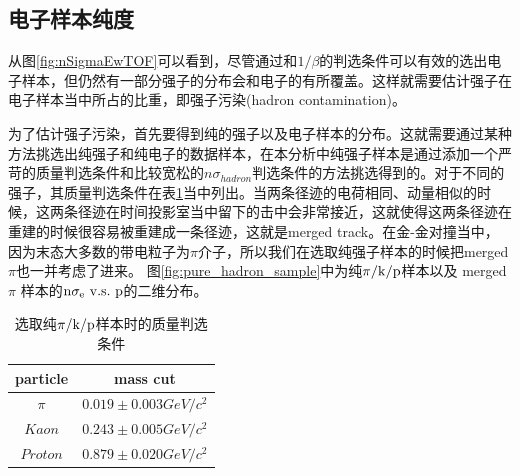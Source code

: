 \subsection{电子样本纯度}
\label{chap:pruity}

从图\ref{fig:nSigmaEwTOF}可以看到，尽管通过\nSigmaE 和$1/\beta$的判选条件可以有效的选出电子样本，但仍然有一部分强子的\nSigmaE 分布会和电子的有所覆盖。这样就需要估计强子在电子样本当中所占的比重，即强子污染(hadron contamination)。

为了估计强子污染，首先要得到纯的强子以及电子样本的\nSigmaE 分布。这就需要通过某种方法挑选出纯强子和纯电子的数据样本，在本分析中纯强子样本是通过添加一个严苛的质量判选条件和比较宽松的$n\sigma_{hadron}$判选条件的方法挑选得到的。对于不同的强子，其质量判选条件在表\ref{tab:pure_sample}当中列出。当两条径迹的电荷相同、动量相似的时候，这两条径迹在时间投影室当中留下的击中会非常接近，这就使得这两条径迹在重建的时候很容易被重建成一条径迹，这就是merged track。在金-金对撞当中，因为末态大多数的带电粒子为$\pi$介子，所以我们在选取纯强子样本的时候把merged $\pi$也一并考虑了进来。
图\ref{fig:pure_hadron_sample}中为纯$\rm{\pi/k/p}$样本以及 merged $\pi$ 样本的$\rm{n\sigma_{e}~v.s.~p}$的二维分布。

\begin{table}[]
    \centering
    \caption{选取纯$\rm{\pi/k/p}$样本时的质量判选条件}
    \begin{tabular}{|c|c|}
        \hline
        particle & mass cut  \\
        \hline
        $\pi$ & $ 0.019 \pm 0.003 GeV/c^2$\\
        \hline
        $Kaon$ & $ 0.243 \pm 0.005 GeV/c^2$\\
        \hline
        $Proton$ & $ 0.879 \pm 0.020 GeV/c^2$ \\
        \hline
    \end{tabular}
    \label{tab:pure_sample}
\end{table}

